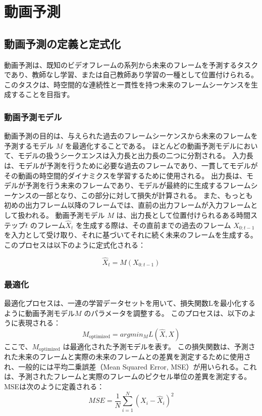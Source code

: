 \chapter{動画予測}

  \section{動画予測の定義と定式化}

    動画予測は、既知のビデオフレームの系列から未来のフレームを予測するタスクであり、教師なし学習、または自己教師あり学習の一種として位置付けられる。
    このタスクは、時空間的な連続性と一貫性を持つ未来のフレームシーケンスを生成することを目指す。

    \subsection{動画予測モデル}
    動画予測の目的は、与えられた過去のフレームシーケンスから未来のフレームを予測するモデル \( M \) を最適化することである。
    ほとんどの動画予測モデルにおいて、モデルの扱うシークエンスは入力長と出力長の二つに分割される。
    入力長は、モデルが予測を行うために必要な過去のフレームであり、一貫してモデルがその動画の時空間的ダイナミクスを学習するために使用される。
    出力長は、モデルが予測を行う未来のフレームであり、モデルが最終的に生成するフレームシーケンスの一部となり、この部分に対して損失が計算される。
    また、もっとも初めの出力フレーム以降のフレームでは、直前の出力フレームが入力フレームとして扱われる。
    動画予測モデル \( M \) は、出力長として位置付けられるある時間ステップ\( t\) のフレーム\( \hat{X}_{t} \) を生成する際は、その直前までの過去のフレーム \( X_{0:t-1} \) を入力として受け取り、それに基づいてそれに続く未来のフレームを生成する。
    このプロセスは以下のように定式化される：

    \begin{equation}
    \hat{X}_{t} = M(X_{0:t-1})
    \end{equation}

    \subsection{最適化}
    最適化プロセスは、一連の学習データセットを用いて、損失関数Lを最小化するように動画予測モデル\( M \) のパラメータを調整する。
    このプロセスは、以下のように表現される：
    \begin{equation}
    M_{\text{optimized}} = argmin_{M} L(\hat{X}, X)
    \end{equation}
    ここで、\( M_{\text{optimized}} \) は最適化された予測モデルを表す。
    この損失関数は、予測された未来のフレームと実際の未来のフレームとの差異を測定するために使用され、一般的には平均二乗誤差（Mean Squared Error, MSE）が用いられる。これは、予測されたフレームと実際のフレームのピクセル単位の差異を測定する。MSEは次のように定義される：
    \begin{equation}
    MSE = \frac{1}{N} \sum_{i=1}^{N} (X_i - \hat{X}_i)^2
    \end{equation}

